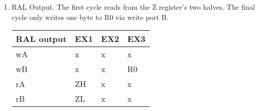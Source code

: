 \documentclass[12pt,letterpaper]{article}
\begin{document}
\begin{enumerate}
\begin{enumerate}
        \item RAL Output. The first cycle reads from the Z register's two halves. The final cycle only writes one byte to R0 via write port B.\\
            \begin{tabular}{l l l l}
                 RAL output & EX1 & EX2 & EX3 \\
                 \hline
                 wA & x & x & x \\
                 wB & x & x & R0 \\
                 rA & ZH & x & x \\
                 rB & ZL & x & x \\
            \end{tabular}

    \end{enumerate}

\end{enumerate}
\end{document}

